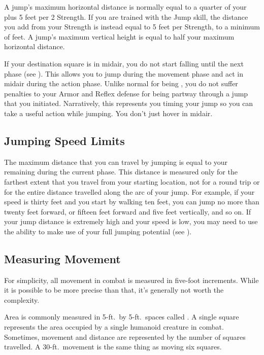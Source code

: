     A jump's maximum horizontal distance is normally equal to a quarter of your  plus 5 feet per 2 Strength.
    If you are trained with the Jump skill, the distance you add from your Strength is instead equal to 5 feet per Strength, to a minimum of  feet.
    A jump's maximum vertical height is equal to half your maximum horizontal distance.

    If your destination square is in midair, you do not start falling until the next phase (see ).
    This allows you to jump during the movement phase and act in midair during the action phase.
    Unlike normal for being , you do not suffer penalties to your Armor and Reflex defense for being partway through a jump that you initiated.
    Narratively, this represents you timing your jump so you can take a useful action while jumping.
    You don't just hover in midair.

  \subsection{Jumping Speed Limits}
    The maximum distance that you can travel by jumping is equal to your remaining  during the current phase.
    This distance is measured only for the farthest extent that you travel from your starting location, not for a round trip or for the entire distance travelled along the arc of your jump.
    For example, if your speed is thirty feet and you start by walking ten feet, you can jump no more than twenty feet forward, or fifteen feet forward and five feet vertically, and so on.
    If your jump distance is extremely high and your speed is low, you may need to use the  ability to make use of your full jumping potential (see ).

  \subsection{Measuring Movement}

    For simplicity, all movement in combat is measured in five-foot increments.
    While it is possible to be more precise than that, it's generally not worth the complexity.

     Area is commonly measured in 5-ft.\ by 5-ft.\ spaces called .
    A single square represents the area occupied by a single humanoid creature in combat.
    Sometimes, movement and distance are represented by the number of squares travelled.
    A 30-ft.\ movement is the same thing as moving six squares.

